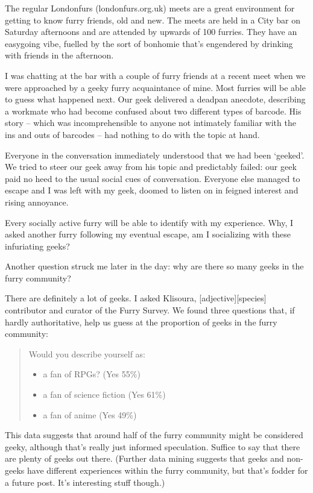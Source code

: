 
The regular Londonfurs (londonfurs.org.uk) meets are a great environment for getting to know furry friends, old and new. The meets are held in a City bar on Saturday afternoons and are attended by upwards of 100 furries. They have an easygoing vibe, fuelled by the sort of bonhomie that's engendered by drinking with friends in the afternoon.

I was chatting at the bar with a couple of furry friends at a recent meet when we were approached by a geeky furry acquaintance of mine. Most furries will be able to guess what happened next. Our geek delivered a deadpan anecdote, describing a workmate who had become confused about two different types of barcode. His story -- which was incomprehensible to anyone not intimately familiar with the ins and outs of barcodes -- had nothing to do with the topic at hand.

Everyone in the conversation immediately understood that we had been ‘geeked'. We tried to steer our geek away from his topic and predictably failed: our geek paid no heed to the usual social cues of conversation. Everyone else managed to escape and I was left with my geek, doomed to listen on in feigned interest and rising annoyance.

Every socially active furry will be able to identify with my experience. Why, I asked another furry following my eventual escape, am I socializing with these infuriating geeks?

Another question struck me later in the day: why are there so many geeks in the furry community?

There are definitely a lot of geeks. I asked Klisoura, [adjective][species] contributor and curator of the Furry Survey. We found three questions that, if hardly authoritative, help us guess at the proportion of geeks in the furry community:

\begin{quotation}
  Would you describe yourself as:
  \begin{itemize}
    \item a fan of RPGs? (Yes 55\%)
    \item a fan of science fiction (Yes 61\%)
    \item a fan of anime (Yes 49\%)
  \end{itemize}
\end{quotation}

This data suggests that around half of the furry community might be considered geeky, although that's really just informed speculation. Suffice to say that there are plenty of geeks out there. (Further data mining suggests that geeks and non-geeks have different experiences within the furry community, but that's fodder for a future post. It's interesting stuff though.)

